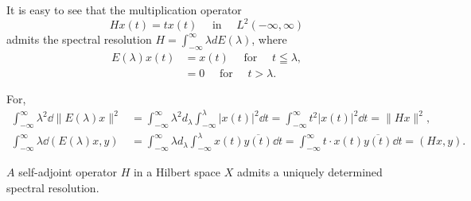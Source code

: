 \begin{examplen} It is easy to see that the multiplication operator
\[
H x (t) = t x (t) \quad \text{ in } \quad L ^{2} (- \infty , \infty)
\]
admits the spectral resolution $H = \int_{-\infty}^{\infty}\lambda dE(\lambda)$, where 
\begin{equation}\label{eq:XI.5.13}
\begin{aligned} E (\lambda) x (t) & = x (t) \quad \text{ for } \quad t \leqq \lambda , \\ & = 0 \quad \text{ for } \quad t > \lambda . \end{aligned}
\end{equation}

For, 
\[
\begin{aligned}
\int_{- \infty} ^{\infty} \lambda^{2} \dd \| E (\lambda) x \| ^{2} &= \int_{- \infty} ^{\infty} \lambda^{2} d _{\lambda} \int_{- \infty} ^{\lambda} | x (t) | ^{2} \dd t = \int_{- \infty} ^{\infty} t ^{2} | x (t) | ^{2} \dd t = \| H x \| ^{2},
\\
\int_{- \infty} ^{\infty} \lambda \dd (E (\lambda) x, y) &= \int_{- \infty} ^{\infty} \lambda d _{\lambda} \int_{- \infty} ^{\lambda} x (t) \overline {{y (t)}} \dd t = \int_{- \infty} ^{\infty} t \cdot x (t) \overline {{y (t)}} \dd t = (H x, y).
\end{aligned}
\]


\end{examplen}
\label{sec:XI.6}

\begin{theorem}\label{thm:XI.6.Theorem.1} $A$ self-adjoint operator $H$ in a Hilbert space $X$ admits a uniquely determined spectral resolution. 
\end{theorem}

